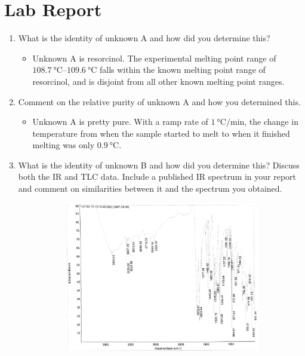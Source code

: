 \documentclass[titlepage]{article}
\begin{document}
\section*{Lab Report}
\begin{enumerate}
    \item What is the identity of unknown A and how did you determine this?
    \begin{itemize}
        \item Unknown A is resorcinol. The experimental melting point range of $\SIrange{108.7}{109.6}{\celsius}$ falls within the known melting point range of resorcinol, and is disjoint from all other known melting point ranges.
    \end{itemize}
    \item Comment on the relative purity of unknown A and how you determined this.
    \begin{itemize}
        \item Unknown A is pretty pure. With a ramp rate of $\SI[per-mode=symbol]{1}{\celsius\per\minute}$, the change in temperature from when the sample started to melt to when it finished melting was only $\SI{0.9}{\celsius}$.
    \end{itemize}
    \item What is the identity of unknown B and how did you determine this? Discuss both the IR and TLC data. Include a published IR spectrum in your report and comment on similarities between it and the spectrum you obtained.
    \begin{figure}[h!]
        \centering
        \begin{subfigure}[b]{0.49\linewidth}
            \centering
            \includegraphics[width=0.9\linewidth]{../../ExtFiles/transCinnamicAcid-IRSpectrum-Experimental.png}

\end{subfigure}
\end{figure}
\end{enumerate}
\end{document}
